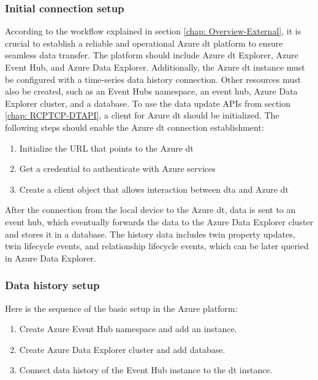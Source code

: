 \subsubsection{Initial connection setup}
According to the workflow explained in section \ref{chap: Overview-External}, 
it is crucial to establish a reliable and operational Azure \gls{dt} platform 
to ensure seamless data transfer. The platform should include Azure \gls{dt} Explorer, 
Azure Event Hub, and Azure Data Explorer. Additionally, the Azure \gls{dt} 
instance must be configured with a time-series data history connection. Other resources 
must also be created, such as an Event Hubs namespace, an event hub, Azure Data Explorer 
cluster, and a database. To use the data update APIs 
from section \ref{chap: RCPTCP-DTAPI}, a client for Azure \gls{dt} should be 
initialized. The following steps should enable the Azure \gls{dt} connection 
establishment: 


\begin{enumerate}
    \item Initialize the URL that points to the Azure \gls{dt}
    \item Get a credential to authenticate with Azure services
    \item Create a client object that allows interaction between \gls{dta} and Azure \gls{dt}
    \end{enumerate}

After the connection from the local device to the Azure \gls{dt}, 
data is sent to an event hub, which eventually forwards the data to 
the Azure Data Explorer cluster and stores it in a database. The history data includes 
twin property updates, twin lifecycle events, and relationship lifecycle events, which 
can be later queried in Azure Data Explorer.


\subsubsection{Data history setup}
Here is the sequence of the basic setup in the Azure platform:
\begin{enumerate}
    \item Create Azure Event Hub namespace and add an instance.
    \item Create Azure Data Explorer cluster and add database.
    \item Connect data history of the Event Hub instance to the \gls{dt} instance.
\end{enumerate}

